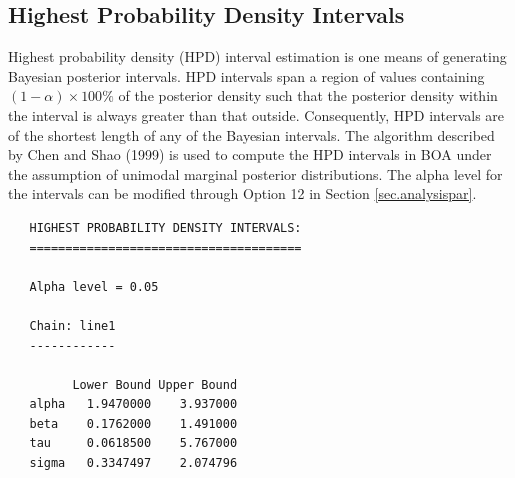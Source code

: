 \documentclass[12pt,letterpaper]{report}
\begin{document}
\subsection{Highest Probability Density Intervals}
\noindent
Highest probability density (HPD) interval estimation is one means of generating
Bayesian posterior intervals. HPD intervals span a region of values containing
$(1 - \alpha) \times 100\%$ of the posterior density such that the posterior
density within the interval is always greater than that outside. Consequently,
HPD intervals are of the shortest length of any of the Bayesian intervals. The
algorithm described by Chen and Shao (1999) is used to compute the HPD
intervals in BOA under the assumption of unimodal marginal posterior
distributions.  The alpha level for the intervals can be modified through Option
12 in Section \ref{sec.analysispar}.
\vskip 9pt
\begin{tiny}
\begin{verbatim}
   HIGHEST PROBABILITY DENSITY INTERVALS:
   ======================================

   Alpha level = 0.05

   Chain: line1
   ------------

         Lower Bound Upper Bound
   alpha   1.9470000    3.937000
   beta    0.1762000    1.491000
   tau     0.0618500    5.767000
   sigma   0.3347497    2.074796
\end{verbatim}
\end{tiny}
\end{document}
